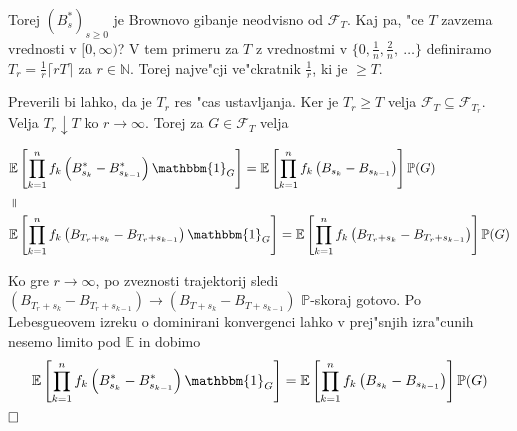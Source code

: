 \documentclass[twoside,11pt]{article}
\begin{document}
\begin{dokaz}
\begin{enumerate}
    \end{enumerate}
    Torej $(B^*_s)_{s\geq0}$ je Brownovo gibanje neodvisno od $\mathcal{F}_T$.
    \noindent
    Kaj pa, "ce $T$ zavzema vrednosti v $[0, \infty)$? V tem primeru za $T$ z vrednostmi v $\{0, \tfrac{1}{n}, \tfrac{2}{n}, \ \ldots \}$
    definiramo $T_r = \tfrac{1}{r}\lceil rT\rceil$ za $r\in\mathbb{N}$. Torej najve"cji ve"ckratnik $\tfrac{1}{r}$, ki je $ \geq T$.

    \begin{figure}[h]
        \centering
    \end{figure}
    
    \pagebreak
    \noindent
     Preverili bi lahko, da je $T_r$ res "cas ustavljanja. Ker je $T_r \geq T$ velja $\mathcal{F}_{T} \subseteq \mathcal{F}_{T_r}$. Velja $T_r \downarrow T$ ko $r \rightarrow \infty$. Torej za $G \in \mathcal{F}_T$ velja

     \begin{align*}
        &\mathbb{E}\left[\prod_{k=1}^nf_k\left(B^*_{s_k} - B^*_{s_{k-1}}\right)\mathbbm{1}_G\right] = \mathbb{E}\left[\prod_{k=1}^nf_k\left(B_{s_k} - B_{s_{k-1}}\right)\right]\mathbb{P}(G) \\
        &\mathrel{\rotatebox[origin=c]{90}{$=$}} \\
        &\mathbb{E}\left[\prod_{k=1}^nf_k\left(B_{T_r +s_k} - B_{T_r + s_{k-1}}\right)\mathbbm{1}_G\right] = \mathbb{E}\left[\prod_{k=1}^nf_k\left(B_{T_r + s_k} - B_{T_r + s_{k-1}}\right)\right]\mathbb{P}(G)
    \end{align*}

    \noindent
    Ko gre $r \rightarrow \infty$, po zveznosti trajektorij sledi $(B_{T_r + s_k} - B_{T_r + s_{k-1}}) \rightarrow (B_{T + s_k} - B_{T + s_{k-1}})$ $\mathbb{P}$-skoraj gotovo. Po Lebesgueovem izreku o dominirani konvergenci lahko v prej"snjih izra"cunih nesemo limito pod $\mathbb{E}$ in dobimo
    $$
        \mathbb{E}\left[\prod_{k=1}^nf_k\left(B^*_{s_k} - B^*_{s_{k-1}}\right)\mathbbm{1}_G\right] = \mathbb{E}\left[\prod_{k=1}^nf_k\left(B_{s_k} - B_{s_{k-1}}\right)\right]\mathbb{P}(G)
    $$
     $\hfill \square$
\end{dokaz}
\end{document}
